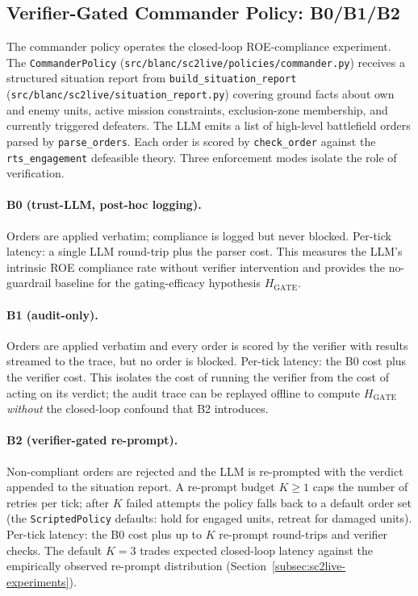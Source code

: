 \documentclass{article}
\theoremstyle{definition}
\begin{document}
\subsection{Verifier-Gated Commander Policy: B0/B1/B2}\label{subsec:sc2live-commander}\label{subsec:roe-compliance}

The commander policy operates the closed-loop ROE-compliance experiment. The \texttt{CommanderPolicy} (\texttt{src/blanc/sc2live/policies/commander.py}) receives a structured situation report from \texttt{build\_situation\_report} (\texttt{src/blanc/sc2live/situation\_report.py}) covering ground facts about own and enemy units, active mission constraints, exclusion-zone membership, and currently triggered defeaters. The LLM emits a list of high-level battlefield orders parsed by \texttt{parse\_orders}. Each order is scored by \texttt{check\_order} against the \texttt{rts\_engagement} defeasible theory. Three enforcement modes isolate the role of verification.

\paragraph{B0 (trust-LLM, post-hoc logging).} Orders are applied verbatim; compliance is logged but never blocked. Per-tick latency: a single LLM round-trip plus the parser cost. This measures the LLM's intrinsic ROE compliance rate without verifier intervention and provides the no-guardrail baseline for the gating-efficacy hypothesis $H_{\mathrm{GATE}}$.

\paragraph{B1 (audit-only).} Orders are applied verbatim and every order is scored by the verifier with results streamed to the trace, but no order is blocked. Per-tick latency: the B0 cost plus the verifier cost. This isolates the cost of running the verifier from the cost of acting on its verdict; the audit trace can be replayed offline to compute $H_{\mathrm{GATE}}$ \emph{without} the closed-loop confound that B2 introduces.

\paragraph{B2 (verifier-gated re-prompt).} Non-compliant orders are rejected and the LLM is re-prompted with the verdict appended to the situation report. A re-prompt budget $K \geq 1$ caps the number of retries per tick; after $K$ failed attempts the policy falls back to a default order set (the \texttt{ScriptedPolicy} defaults: hold for engaged units, retreat for damaged units). Per-tick latency: the B0 cost plus up to $K$ re-prompt round-trips and verifier checks. The default $K = 3$ trades expected closed-loop latency against the empirically observed re-prompt distribution (Section~\ref{subsec:sc2live-experiments}).
\end{document}
